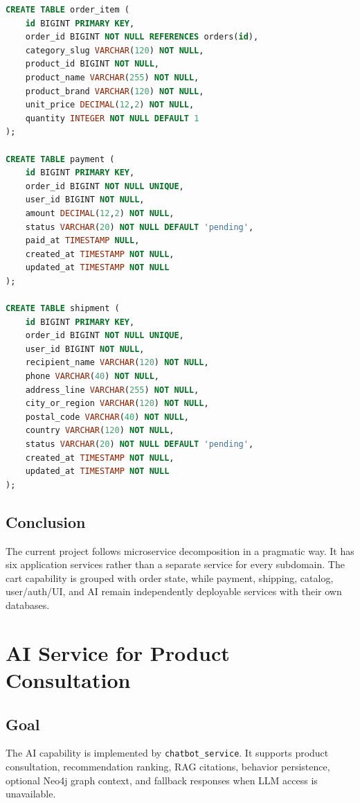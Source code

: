 \documentclass[12pt,a4paper]{article}
\newcommand{\codepath}[1]{{\small\texttt{#1}}}
\begin{document}
\begin{lstlisting}[language=SQL,caption={Database schema summary for the e-commerce system.}]
CREATE TABLE order_item (
    id BIGINT PRIMARY KEY,
    order_id BIGINT NOT NULL REFERENCES orders(id),
    category_slug VARCHAR(120) NOT NULL,
    product_id BIGINT NOT NULL,
    product_name VARCHAR(255) NOT NULL,
    product_brand VARCHAR(120) NOT NULL,
    unit_price DECIMAL(12,2) NOT NULL,
    quantity INTEGER NOT NULL DEFAULT 1
);

CREATE TABLE payment (
    id BIGINT PRIMARY KEY,
    order_id BIGINT NOT NULL UNIQUE,
    user_id BIGINT NOT NULL,
    amount DECIMAL(12,2) NOT NULL,
    status VARCHAR(20) NOT NULL DEFAULT 'pending',
    paid_at TIMESTAMP NULL,
    created_at TIMESTAMP NOT NULL,
    updated_at TIMESTAMP NOT NULL
);

CREATE TABLE shipment (
    id BIGINT PRIMARY KEY,
    order_id BIGINT NOT NULL UNIQUE,
    user_id BIGINT NOT NULL,
    recipient_name VARCHAR(120) NOT NULL,
    phone VARCHAR(40) NOT NULL,
    address_line VARCHAR(255) NOT NULL,
    city_or_region VARCHAR(120) NOT NULL,
    postal_code VARCHAR(40) NOT NULL,
    country VARCHAR(120) NOT NULL,
    status VARCHAR(20) NOT NULL DEFAULT 'pending',
    created_at TIMESTAMP NOT NULL,
    updated_at TIMESTAMP NOT NULL
);
\end{lstlisting}

\subsection{Conclusion}

The current project follows microservice decomposition in a pragmatic way. It has six application services rather than a separate service for every subdomain. The cart capability is grouped with order state, while payment, shipping, catalog, user/auth/UI, and AI remain independently deployable services with their own databases.

\section{AI Service for Product Consultation}

\subsection{Goal}

The AI capability is implemented by \codepath{chatbot\_service}. It supports product consultation, recommendation ranking, RAG citations, behavior persistence, optional Neo4j graph context, and fallback responses when LLM access is unavailable.
\end{document}

